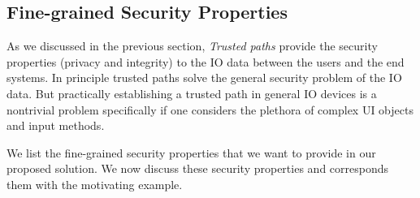 \subsection{Fine-grained Security Properties}

As we discussed in the previous section, \emph{Trusted paths} provide the security properties (privacy and integrity) to the IO data between the users and the end systems. In principle trusted paths solve the general security problem of the IO data. But practically establishing a trusted path in general IO devices is a nontrivial problem specifically if one considers the plethora of complex UI objects and input methods.

We list the fine-grained security properties that we want to provide in our proposed solution. We now discuss these security properties and corresponds them with the motivating example.

